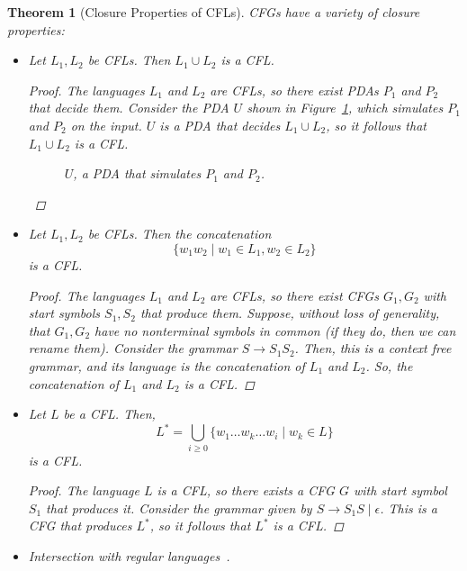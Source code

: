 \documentclass[psamsfonts]{amsart}
\newtheorem{thm}{Theorem}[section]
\theoremstyle{definition}
\theoremstyle{remark}
\numberwithin{equation}{section}
\begin{document}
\begin{thm}[Closure Properties of \acp{CFL}]
  \aclp{CFG} have a variety of closure properties:
  \begin{itemize}
  \item Let $L_1,L_2$ be \acp{CFL}. Then $L_1\cup L_2$ is a \ac{CFL}.
    \begin{proof}
      The languages $L_1$ and $L_2$ are \aclp{CFL}, so there exist \aclp{PDA} $P_1$ and $P_2$
      that decide them. Consider the \ac{PDA} $U$ shown in
      Figure~\ref{pda:union}, which simulates $P_1$ and $P_2$ on the input. $U$
      is a \ac{PDA} that decides $L_1\cup L_2$, so it follows that
      $L_1\cup L_2$ is a \ac{CFL}.
      \begin{figure}[h]
        \caption{$U$, a \ac{PDA} that simulates $P_1$ and $P_2$.}
        \label{pda:union}
      \end{figure}
    \end{proof}
  \item Let $L_1,L_2$ be \acp{CFL}. Then the concatenation \[
      \{w_1w_2 \mid w_1\in L_1, w_2 \in L_2\}
    \]
    is a \ac{CFL}.
    \begin{proof}
      The languages $L_1$ and $L_2$ are \aclp{CFL}, so there exist \acp{CFG}
      $G_1,G_2$ with start symbols $S_1,S_2$ that produce them. Suppose, without loss of generality, that
      $G_1,G_2$ have no nonterminal symbols in common (if they do, then we can rename
      them). Consider the grammar $S \rightarrow S_1S_2$. Then, this is a
      context free grammar, and its language is the concatenation of $L_1$ and
      $L_2$. So, the concatenation of $L_1$ and $L_2$ is a \ac{CFL}.
    \end{proof}
  \item Let $L$ be a \ac{CFL}. Then,
    \[
      L^* = \bigcup_{i \geq 0}\{w_1 \dots w_k\dots w_i \mid w_k\in L\}
    \]
    is a \ac{CFL}.
    \begin{proof}
      The language $L$ is a \ac{CFL}, so there exists a \ac{CFG} $G$ with start
      symbol $S_1$ that produces it. Consider the grammar given by $S\rightarrow
      S_1S\mid\epsilon$. This is a \ac{CFG} that produces $L^*$, so it follows
      that $L^*$ is a \ac{CFL}.
    \end{proof}
    \item Intersection with regular languages~\cite{hopcroft07:_introd_autom_theor_languag_comput}.
  \end{itemize}
\end{thm}
\end{document}
